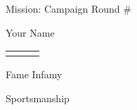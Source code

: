 \documentclass{nova}
\begin{document}

\begin{minipage}{0.5\linewidth-1em}
  
\end{minipage}
Mission: 
Campaign Round \#

Your Name

\begin{tabular}{rcl}
  &&
\end{tabular}
Fame Infamy

Sportsmanship
\end{document}
